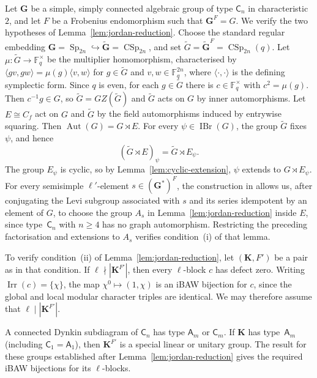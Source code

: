 \documentclass[10pt]{amsart}
\theoremstyle{definition}
\renewcommand{\geq}{\geqslant}
\let\oldendproof\endproof
\renewenvironment{proof}[1][\proofname]{%
  \oldproof[\bfseries #1]%
}{\oldendproof}
\DeclareMathOperator{\Aut}{Aut}
\DeclareMathOperator{\IBr}{IBr}
\DeclareMathOperator{\Irr}{Irr}
\DeclareMathOperator{\Sp}{Sp}
\DeclareMathOperator{\CSp}{CSp}
\newcommand{\F}{\mathbb F}
\numberwithin{equation}{section}
\numberwithin{table}{section}
\begin{document}
\begin{proof}
Let $\mathbf G$ be a simple, simply connected algebraic group of type
$\mathsf C_n$ in characteristic $2$, and let $F$ be a Frobenius endomorphism
such that $\mathbf G^F=G$.  We verify the two hypotheses of
Lemma~\ref{lem:jordan-reduction}.  Choose the standard regular embedding
$\mathbf G=\Sp_{2n}\hookrightarrow\widetilde{\mathbf G}=\CSp_{2n}$,
and set $\widetilde G=\widetilde{\mathbf G}^F=\CSp_{2n}(q)$.
Let $\mu:\widetilde G\to\F_q^\times$ be the multiplier homomorphism,
characterised by $\langle gv,gw\rangle=\mu(g)\langle v,w\rangle$ for
$g\in\widetilde G$ and $v,w\in\F_q^{2n}$, where
$\langle\cdot,\cdot\rangle$ is the defining symplectic form.
Since $q$ is even, for each $g\in\widetilde G$ there is
$c\in\F_q^\times$ with $c^2=\mu(g)$.  Then $c^{-1}g\in G$, so
$\widetilde G=GZ(\widetilde G)$ and $\widetilde G$ acts on $G$
by inner automorphisms. Let $E\cong C_f$ act on $G$ and
$\widetilde G$ by the field automorphisms induced by entrywise squaring.
Then
$\Aut(G)=G\rtimes E$.  For every $\psi\in\IBr(G)$, the group
$\widetilde G$ fixes $\psi$, and hence
\[
 (\widetilde G\rtimes E)_\psi=\widetilde G\rtimes E_\psi.
\]
The group $E_\psi$ is cyclic, so by Lemma~\ref{lem:cyclic-extension},
$\psi$ extends to $G\rtimes E_\psi$.
For every semisimple $\ell'$-element $s\in(\mathbf G^*)^F$, the
construction in \cite[Corollary~4.2 and Lemmas~4.3 and~4.5]{Ruhstorfer2022Derived}
allows us, after conjugating the Levi subgroup associated with $s$ and
its series idempotent by an element of $G$, to choose the group $A_s$ in
Lemma~\ref{lem:jordan-reduction} inside $E$, since type~$\mathsf C_n$
with $n\geq4$ has no graph automorphism.
Restricting the preceding factorisation and extensions to $A_s$ verifies
condition~\textup{(i)} of that lemma.

To verify condition~\textup{(ii)} of
Lemma~\ref{lem:jordan-reduction}, let $(\mathbf K,F')$ be a pair
as in that condition.  If $\ell\nmid|\mathbf K^{F'}|$, then every $\ell$-block $c$ has defect
zero.  Writing $\Irr(c)=\{\chi\}$, the map $\chi^0\mapsto(1,\chi)$ is
an iBAW bijection for $c$, since the global and local modular character
triples are identical.  We may therefore assume that
$\ell\mid|\mathbf K^{F'}|$.

A connected Dynkin subdiagram of $\mathsf C_n$ has type $\mathsf A_m$ or
$\mathsf C_m$. If $\mathbf K$ has type~$\mathsf A_m$
(including $\mathsf C_1=\mathsf A_1$), then $\mathbf K^{F'}$
is a special linear or unitary group. The result for these groups
established after Lemma~\ref{lem:jordan-reduction} gives the required
iBAW bijections for its $\ell$-blocks.


\end{proof}
\end{document}
